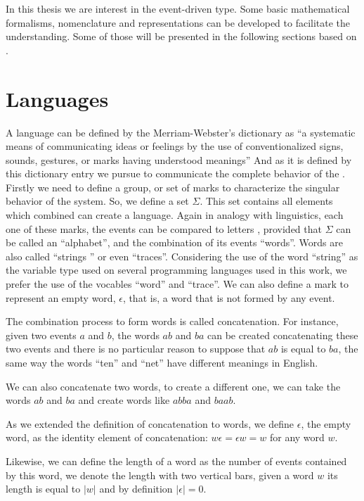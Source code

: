 In this thesis we are interest in the event-driven type. Some basic mathematical
formalisms, nomenclature and representations can be
developed to facilitate the understanding. Some of those will be presented in
the following sections based on \cite{cassandras2009introduction,
david2005discrete,david1989grafcet}.
\section{Languages}
\label{sec:automata}
A language can be defined by the Merriam-Webster's dictionary as ``a systematic means of communicating ideas or feelings by the use of conventionalized signs, sounds, gestures, or marks having understood meanings''
And as it is defined by this dictionary entry we pursue to communicate the complete
behavior of the \DES.
Firstly we need to define a group, or
set of marks to characterize the singular behavior of the system.
So, we define a
set $\Sigma$. This set contains all elements which combined can create a language.
Again in analogy with linguistics, each one of these marks, the events can be
compared to
letters
, provided that $\Sigma$ can be called an ``alphabet'', and the combination of
its events ``words''. Words are also called ``strings '' or even ``traces''. Considering
the use of the word ``string'' as the variable type used on several programming languages
used in this work, we prefer the use of the vocables ``word'' and ``trace''. We can also define a mark to represent an empty word,
$\epsilon$, that is, a word that is not formed by any event.

The combination process to form words is called concatenation. For instance,
given two events $a$ and $b$, the words $ab$ and $ba$ can be created
concatenating these two events and there is no particular reason to suppose that
$ab$ is equal to $ba$, the same way the words ``ten'' and ``net''
have different meanings in English. 

We can also concatenate two words, to create a different one, we can take the
words $ab$ and $ba$ and create words like $abba$ and $baab$.

As we extended the definition of concatenation to words,
we define $\epsilon$, the empty word, as the identity element of concatenation:
$w\epsilon = \epsilon w = w$ for any word $w$.

Likewise, we can define the length of a word as the number of events contained by
this word, we denote the length with two vertical bars, given a word $w$ its
length is equal to $|w|$ and by definition $|\epsilon| = 0 $.

